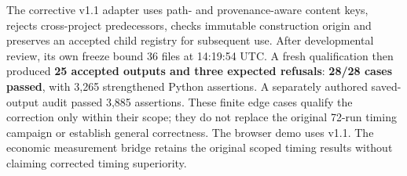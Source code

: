 The corrective v1.1 adapter uses path- and provenance-aware content keys, rejects cross-project predecessors, checks immutable construction origin and preserves an accepted child registry for subsequent use. After developmental review, its own freeze bound 36 files at 14:19:54 UTC. A fresh qualification then produced \textbf{25 accepted outputs and three expected refusals}: \textbf{28/28 cases passed}, with 3,265 strengthened Python assertions. A separately authored saved-output audit passed 3,885 assertions. These finite edge cases qualify the correction only within their scope; they do not replace the original 72-run timing campaign or establish general correctness. The browser demo uses v1.1. The economic measurement bridge retains the original scoped timing results without claiming corrected timing superiority.
